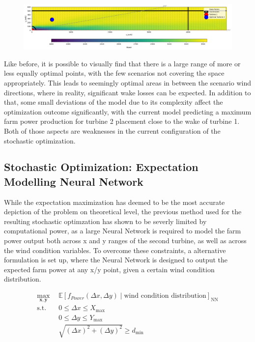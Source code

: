 \documentclass[preprint,12pt]{elsarticle}
\begin{document}
\begin{figure}[h] 
	\centering
	\includegraphics[width=1\textwidth]{../figures/optimization/prob_data_lininter.png} 
	\caption{}
	\label{fig:prob_data_lininter}
\end{figure}

Like before, it is possible to visually find that there is a large range of more or less equally optimal points, with the few scenarios not covering the space appropriately. This leads to seemingly optimal areas in between the scenario wind directions, where in reality, significant wake losses can be expected. In addition to that, some small deviations of the model due to its complexity affect the optimization outcome significantly, with the current model predicting a maximum farm power production for turbine 2 placement close to the wake of turbine 1. Both of those aspects are weaknesses in the current configuration of the stochastic optimization.

\subsection{Stochastic Optimization:  Expectation Modelling Neural Network}

While the expectation maximization has deemed to be the most accurate depiction of the problem on theoretical level, the previous method used for the resulting stochastic optimzation has shown to be severly limited by computational power, as a large Neural Network is required to model the farm power output both across x and y ranges of the second turbine, as well as across the wind condition variables. 
To overcome these constraints, a alternative formulation is set up, where the Neural Network is designed to output the expected farm power at any x/y point, given a certain wind condition distribution. 



\begin{align}
	\max_{\mathbf{x}, \mathbf{y}} &  \mathbb{E}[f_{Power}(\Delta x, \Delta y) \mid \text{wind condition distribution}]_\text{NN} \\
	\text{s.t.} \quad 
	&  0  \leq \Delta x \leq X_{\max} \\
	&  0  \leq \Delta y \leq Y_{\max} \\
	& \sqrt{(\Delta x)^2 + (\Delta y)^2} \geq d_{\min}
\end{align}
\end{document}

